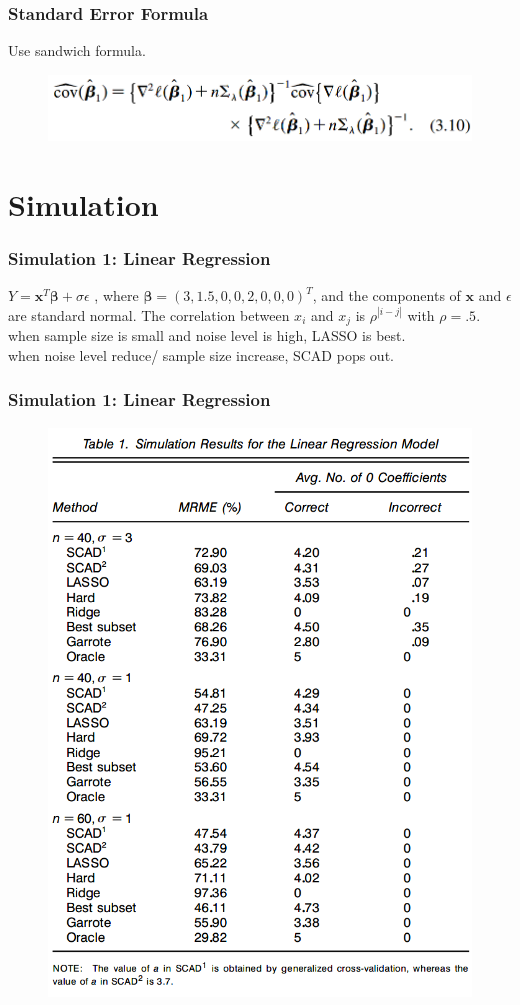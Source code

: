 \documentclass{beamer}
\begin{document}
	
	\begin{frame}
		\frametitle{Standard Error Formula}
		Use sandwich formula.
		\begin{figure}
			\includegraphics[width=0.7\linewidth]{image018.png}
		\end{figure}
	\end{frame}
	
	\section{Simulation}
	\begin{frame}
		\frametitle{Simulation 1: Linear Regression}
		$Y = \bm{x}^T\bm{\beta} + \sigma\epsilon$
		, where $\bm{\beta} = (3, 1.5, 0, 0, 2 ,0 ,0 ,0)^T$, and the components of $\bm{x}$ and $\epsilon$ are standard normal. The correlation between $x_i$ and $x_j$ is $\rho^{|i-j|}$ with $\rho = .5$.\\
		\vspace{\baselineskip}
		when sample size is small and noise level is high, LASSO is best.\\
		\vspace{\baselineskip}
		when noise level reduce/ sample size increase, SCAD pops out.
	\end{frame}
	
	\begin{frame}
		\frametitle{Simulation 1: Linear Regression}
		\begin{figure}
			\includegraphics[width=0.5\linewidth]{image019.png}
		\end{figure}
	\end{frame}
	
\end{document}
